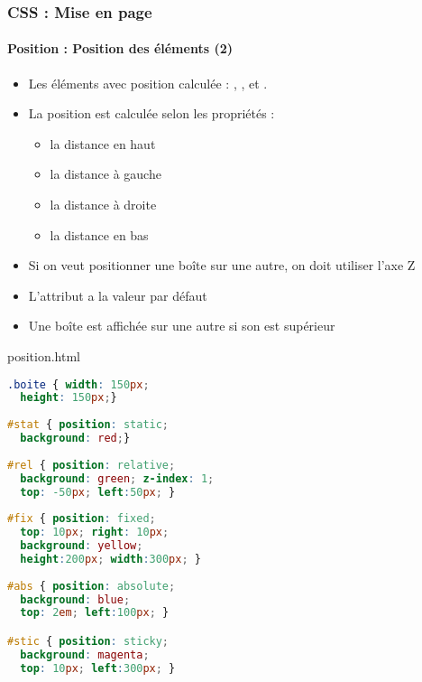 \documentclass[xcolor=table]{beamer}
\begin{document}
\begin{frame}[fragile]
\frametitle{CSS : Mise en page}
\framesubtitle{Position : Position des éléments (2)}

\begin{minipage}{0.60\textwidth}
	\begin{itemize}
		\item Les éléments avec position calculée : , ,  et .
		\item La position est calculée selon les propriétés :
		\begin{itemize}
			\item {} la distance en haut
			\item {} la distance à gauche
			\item {} la distance à droite
			\item {} la distance en bas
		\end{itemize}
		\item Si on veut positionner une boîte sur une autre, on doit utiliser l'axe Z 
		\item L'attribut  a la valeur  par défaut
		\item Une boîte est affichée sur une autre si son  est supérieur
	\end{itemize}
\end{minipage}
%
\begin{minipage}{0.38\textwidth}
	\begin{exampleblock}{position.html}
		\lstset{escapeinside=**}
		\tiny\bfseries\vspace{-6pt}
\begin{lstlisting}[language={CSS}]
.boite { width: 150px; 
  height: 150px;}
  
#stat { position: static;
  background: red;}
  
#rel { position: relative;
  background: green; z-index: 1;
  top: -50px; left:50px; }
  
#fix { position: fixed;
  top: 10px; right: 10px;
  background: yellow;
  height:200px; width:300px; }
  
#abs { position: absolute;
  background: blue;
  top: 2em; left:100px; }

#stic { position: sticky;
  background: magenta;
  top: 10px; left:300px; }
\end{lstlisting}\vspace{-6pt}
	\end{exampleblock}
\end{minipage}
\end{frame}
\end{document}
